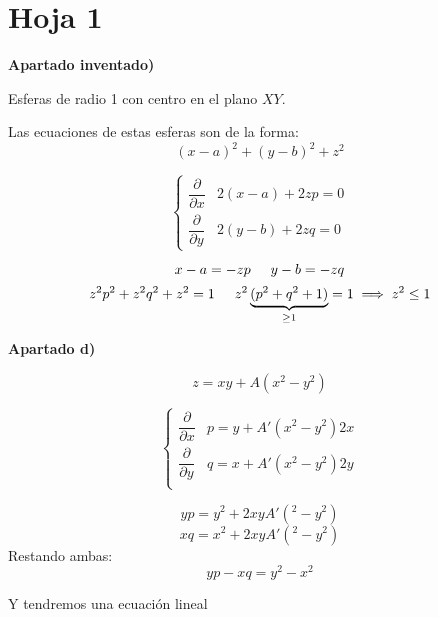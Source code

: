 \documentclass[openany]{book}
\begin{document}
\section{Hoja 1}
\setcounter{ex}{1}
\begin{exercise}

  \begin{flushright}
    \textbf{Apartado inventado)}
  \end{flushright}

  Esferas de radio 1 con centro en el plano $ XY $.

  Las ecuaciones de estas esferas son de la forma:
  $$ (x-a)^2+(y-b)^2+z^2 $$

  $$ \left\{
  \begin{array}{ll}
    \dfrac{\partial }{\partial x} & 2(x-a)+2zp = 0\\ 
    \dfrac{\partial }{\partial y} & 2(y-b) + 2zq = 0
  \end{array}
  \right. $$

  $$ x-a = -zp \hspace{5mm} y-b = -zq $$
  $$  z^2p^2+z^2q^2+z^2=1 \hspace{5mm} z^2\underbrace{(p^2+q^2+1)}_{\geq  1} = 1 \implies z^2 \leq  1$$

  \begin{flushright}
    \textbf{Apartado d)}
  \end{flushright}

  $$ z = xy+A(x^2-y^2) $$
  
  $$ \left\{
  \begin{array}{ll}
    \dfrac{\partial }{\partial x} & p = y+A'(x^2-y^2)2x\\ 
    \dfrac{\partial }{\partial y} & q = x + A'(x^2-y^2)2y\\ 
  \end{array}
  \right. $$

  $$ yp = y^2+2xyA'(^2-y^2) $$
  $$ xq = x^2+2xyA'(^2-y^2) $$
  Restando ambas:
  $$ yp - xq = y^2-x^2 $$

  Y tendremos una ecuación lineal

\end{exercise}
\end{document}
